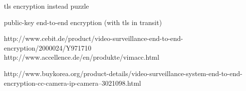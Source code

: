 
tls encryption instead puzzle

public-key end-to-end encryption (with tls in transit)

http://www.cebit.de/product/video-surveillance-end-to-end-encryption/2000024/Y971710
http://www.accellence.de/en/produkte/vimacc.html

http://www.buykorea.org/product-details/video-surveillance-system-end-to-end-encryption-cc-camera-ip-camera--3021098.html
